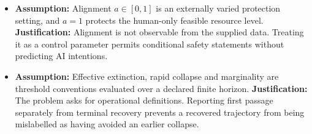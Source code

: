 \documentclass[12pt,a4paper]{article}
\theoremstyle{remark}
\begin{document}
\begin{itemize}
\item \textbf{Assumption:} Alignment $a\in[0,1]$ is an externally varied protection setting, and $a=1$ protects the human-only feasible resource level.
\textbf{Justification:} Alignment is not observable from the supplied data. Treating it as a control parameter permits conditional safety statements without predicting AI intentions.

\item \textbf{Assumption:} Effective extinction, rapid collapse and marginality are threshold conventions evaluated over a declared finite horizon.
\textbf{Justification:} The problem asks for operational definitions. Reporting first passage separately from terminal recovery prevents a recovered trajectory from being mislabelled as having avoided an earlier collapse.
\end{itemize}
\end{document}
